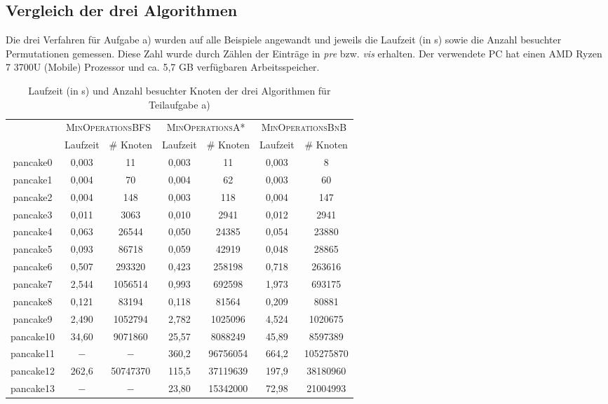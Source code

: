\documentclass[a4paper, 10pt, ngerman]{article}
\begin{document}
\subsection{Vergleich der drei Algorithmen}

Die drei Verfahren für Aufgabe a) wurden auf alle Beispiele angewandt und jeweils die Laufzeit (in s) sowie die Anzahl besuchter Permutationen gemessen. Diese Zahl wurde durch Zählen der Einträge in \emph{pre} bzw. \emph{vis} erhalten. Der verwendete PC hat einen AMD Ryzen 7 3700U (Mobile) Prozessor und ca. 5,7 GB verfügbaren Arbeitsspeicher.

\begin{table}[H]
    \centering
    \begin{tabular}{c c c c c c c}
        & \multicolumn{2}{c}{\textsc{MinOperationsBFS}} &
        \multicolumn{2}{c}{\textsc{MinOperationsA*}} &
        \multicolumn{2}{c}{\textsc{MinOperationsBnB}} \\
        & Laufzeit & \# Knoten & Laufzeit & \# Knoten & Laufzeit & \# Knoten \\
        \cmidrule{1-7}
        pancake0 & 0,003 & 11 & 0,003 & 11 & 0,003 & 8 \\
        pancake1 & 0,004 & 70 & 0,004 & 62 & 0,003 & 60  \\
        pancake2 & 0,004 & 148 & 0,003 & 118 & 0,004 & 147  \\
        pancake3 & 0,011 & 3063 & 0,010 & 2941 & 0,012 & 2941  \\
        pancake4 & 0,063 & 26544 & 0,050 & 24385 & 0,054 & 23880 \\
        pancake5 & 0,093 & 86718 & 0,059 & 42919 & 0,048 & 28865 \\
        pancake6 & 0,507 & 293320 & 0,423 & 258198 & 0,718 & 263616 \\
        pancake7 & 2,544 & 1056514 & 0,993 & 692598 & 1,973 & 693175 \\
        pancake8 & 0,121 & 83194 & 0,118 & 81564 & 0,209 & 80881 \\
        pancake9 & 2,490 & 1052794 & 2,782 & 1025096 & 4,524 & 1020675 \\
        pancake10 & 34,60 & 9071860 & 25,57 & 8088249 & 45,89 & 8597389 \\
        pancake11 & $-$ & $-$ & 360,2 & 96756054 & 664,2 & 105275870 \\
        pancake12 & 262,6 & 50747370 & 115,5 & 37119639 & 197,9 & 38180960 \\
        pancake13 & $-$ & $-$ & 23,80 & 15342000 & 72,98 & 21004993 \\
    \end{tabular}
    \caption{Laufzeit (in s) und Anzahl besuchter Knoten der drei Algorithmen für Teilaufgabe a)}
\end{table}
\end{document}
